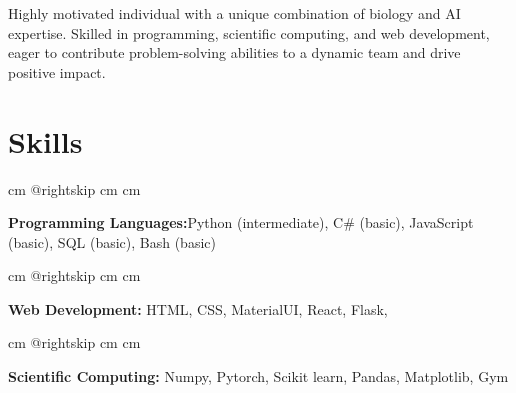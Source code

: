 \documentclass[10pt, letterpaper]{article}
\let\hrefWithoutArrow\href
\renewcommand{\href}[2]{\hrefWithoutArrow{#1}{\mbox{\ifthenelse{\equal{#2}{}}{ }{#2 }\raisebox{.15ex}{\footnotesize \faExternalLink*}}}}
\begin{document}
        \begin{changemargin}{0.2 cm}{0.2 cm}
        Highly motivated individual with a unique combination of biology and AI expertise. Skilled in programming, scientific computing, and web development, eager to contribute problem-solving abilities to a dynamic team and drive positive impact.  
                \end{changemargin}

    \section{Skills}
        \begingroup{} cm
        \advance\csname @rightskip cm
        \advance{} cm

        \textbf{Programming Languages:}Python (intermediate), C\# (basic), JavaScript (basic), SQL (basic), Bash (basic) \par\endgroup

        \vspace{0.2 cm}

        \begingroup{} cm
        \advance\csname @rightskip cm
        \advance{} cm

        \textbf{Web Development: } HTML, CSS, MaterialUI, React, Flask,  \par\endgroup
                
        \vspace{0.2 cm}
        
        \begingroup{} cm
        \advance\csname @rightskip cm
        \advance{} cm

        \textbf{Scientific Computing: } Numpy, Pytorch, Scikit learn, Pandas, Matplotlib, Gym \par\endgroup
        
\end{document}
